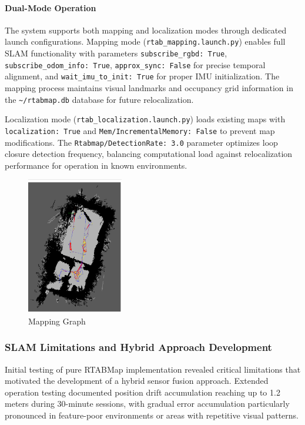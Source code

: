 \paragraph{Dual-Mode Operation}

The system supports both mapping and localization modes through dedicated launch configurations. Mapping mode (\texttt{rtab\_mapping.launch.py}) enables full SLAM functionality with parameters \texttt{subscribe\_rgbd: True}, \texttt{subscribe\_odom\_info: True}, \texttt{approx\_sync: False} for precise temporal alignment, and \texttt{wait\_imu\_to\_init: True} for proper IMU initialization. The mapping process maintains visual landmarks and occupancy grid information in the \texttt{\textasciitilde/rtabmap.db} database for future relocalization.

Localization mode (\texttt{rtab\_localization.launch.py}) loads existing maps with \texttt{localization: True} and \texttt{Mem/IncrementalMemory: False} to prevent map modifications. The \texttt{Rtabmap/DetectionRate: 3.0} parameter optimizes loop closure detection frequency, balancing computational load against relocalization performance for operation in known environments.

\begin{figure}[H]
    \centering
    \includegraphics[height=6cm]{Images/mapping graph.png}
    \caption{Mapping Graph}
    \label{fig:mapping_graph}
\end{figure}

\subsubsection{SLAM Limitations and Hybrid Approach Development}

Initial testing of pure RTABMap implementation revealed critical limitations that motivated the development of a hybrid sensor fusion approach. Extended operation testing documented position drift accumulation reaching up to 1.2 meters during 30-minute sessions, with gradual error accumulation particularly pronounced in feature-poor environments or areas with repetitive visual patterns.

